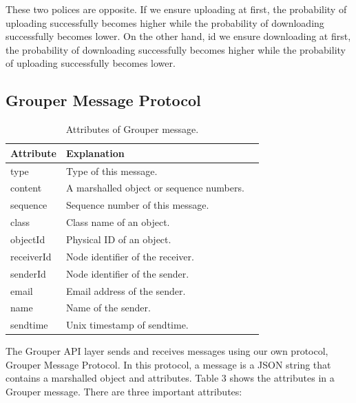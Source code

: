 \documentclass[twocolumn,10pt]{article}
\begin{document}
These two polices are opposite.
If we ensure uploading at first, the probability of uploading successfully becomes higher while the probability of downloading successfully becomes lower.
On the other hand, id we ensure downloading at first, the probability of downloading successfully becomes higher while the probability of uploading successfully becomes lower.

\subsection{Grouper Message Protocol}

\begin{table}[t]
	\centering
	\caption{Attributes of Grouper message.}
	\label{my-label}
	\begin{tabular}{lll}
		\hline
		\textbf{Attribute} & \textbf{Explanation} \\ \hline
		type & Type of this message. \\
		content & A marshalled object or sequence numbers. \\
		sequence & Sequence number of this message. \\
		class & Class name of an object. \\
		objectId & Physical ID of an object. \\
		receiverId & Node identifier of the receiver. \\
		senderId & Node identifier of the sender. \\
		email & Email address of the sender. \\
		name & Name of the sender. \\
		sendtime & Unix timestamp of sendtime. \\
		\hline
	\end{tabular}
\end{table}

The Grouper API layer sends and receives messages using our own protocol, Grouper Message Protocol.
In this protocol, a message is a JSON string that contains a marshalled object and attributes.
Table 3 shows the attributes in a Grouper message.
There are three important attributes:
\end{document}
